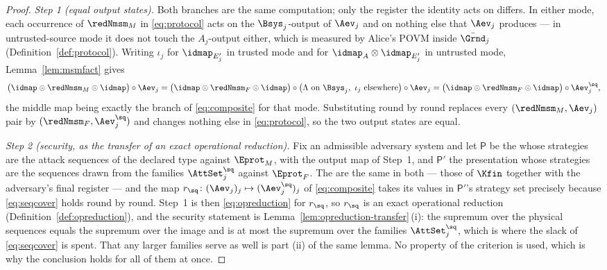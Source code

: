 \begin{proof}
\emph{Step 1 (equal output states).} Both branches are the same computation;
only the register the identity acts on differs. In either mode, each
occurrence of $\redNmsm_M$ in \eqref{eq:protocol} acts on the $\Bsys_j$-output
of $\Aev_j$ and on nothing else that $\Aev_j$ produces --- in untrusted-source
mode it does not touch the $A_j$-output either, which is measured by Alice's
POVM inside $\bar{\Grnd}_j$ (Definition~\ref{def:protocol}). Writing $\iota_j$
for $\idmap_{E'_j}$ in trusted mode and for $\idmap_{A}\otimes\idmap_{E'_j}$
in untrusted mode, Lemma~\ref{lem:msmfact} gives
\begin{equation*}
  \big(\idmap\otimes\redNmsm_M\otimes\idmap\big)\circ\Aev_j
  =\big(\idmap\otimes\redNmsm_F\otimes\idmap\big)\circ
   \big(\Lambda\ \text{on }\Bsys_j,\ \iota_j\ \text{elsewhere}\big)\circ\Aev_j
  =\big(\idmap\otimes\redNmsm_F\otimes\idmap\big)\circ\Aev^{\sq}_j ,
\end{equation*}
the middle map being exactly the branch of \eqref{eq:composite} for that mode.
Substituting round by round replaces every $(\redNmsm_M,\Aev_j)$ pair by
$(\redNmsm_F,\Aev^{\sq}_j)$ and changes nothing else in \eqref{eq:protocol}, so
the two output states are equal.

\emph{Step 2 (security, as the transfer of an exact operational reduction).}
Fix an admissible adversary system and let $\mathsf{P}$ be the
 whose strategies are the attack
sequences of the declared type against $\Eprot_M$, with the output map of
Step~1, and $\mathsf{P}'$ the presentation whose strategies are the sequences
drawn from the families $\AttSet^{\sq}_j$ against $\Eprot_F$. The
 are the same in both --- those of
$\Kfin$ together with the adversary's final register --- and the map
$r_{\sq}\colon(\Aev_j)_j\mapsto(\Aev^{\sq}_j)_j$ of \eqref{eq:composite} takes
its values in $\mathsf{P}'$'s strategy set precisely because
\eqref{eq:seqcover} holds round by round. Step~1 is then
\eqref{eq:opreduction} for $r_{\sq}$, so $r_{\sq}$ is an exact operational
reduction (Definition~\ref{def:opreduction}), and the security statement is
Lemma~\ref{lem:opreduction-transfer}\,(i): the supremum over the physical
sequences equals the supremum over the image and is at most the supremum over
the families $\AttSet^{\sq}_j$, which is where the slack of
\eqref{eq:seqcover} is spent. That any larger families serve as well is part
(ii) of the same lemma. No property of the criterion is used, which is why the
conclusion holds for all of them at once.
\end{proof}
